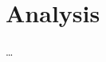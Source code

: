 
\chapter{Analysis} %



\ifpdf
    \graphicspath{{7/figures/PNG/}{7/figures/PDF/}{7/figures/}}
\else
    \graphicspath{{7/figures/EPS/}{7/figures/}}
\fi


% 

\dots



